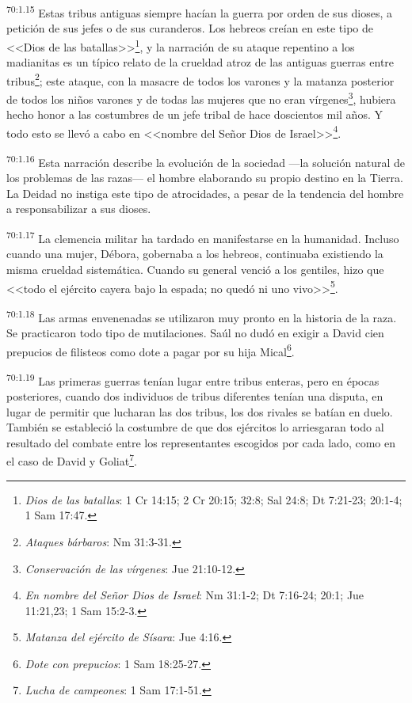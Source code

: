 \par
\textsuperscript{70:1.15} Estas tribus antiguas siempre hacían la guerra por orden de sus dioses, a petición de sus jefes o de sus curanderos. Los hebreos creían en este tipo de <<Dios de las batallas>>\footnote{\textit{Dios de las batallas}: 1 Cr 14:15; 2 Cr 20:15; 32:8; Sal 24:8; Dt 7:21-23; 20:1-4; 1 Sam 17:47.}, y la narración de su ataque repentino a los madianitas es un típico relato de la crueldad atroz de las antiguas guerras entre tribus\footnote{\textit{Ataques bárbaros}: Nm 31:3-31.}; este ataque, con la masacre de todos los varones y la matanza posterior de todos los niños varones y de todas las mujeres que no eran vírgenes\footnote{\textit{Conservación de las vírgenes}: Jue 21:10-12.}, hubiera hecho honor a las costumbres de un jefe tribal de hace doscientos mil años. Y todo esto se llevó a cabo en <<nombre del Señor Dios de Israel>>\footnote{\textit{En nombre del Señor Dios de Israel}: Nm 31:1-2; Dt 7:16-24; 20:1; Jue 11:21,23; 1 Sam 15:2-3.}.

\par
\textsuperscript{70:1.16} Esta narración describe la evolución de la sociedad ---la solución natural de los problemas de las razas--- el hombre elaborando su propio destino en la Tierra. La Deidad no instiga este tipo de atrocidades, a pesar de la tendencia del hombre a responsabilizar a sus dioses.

\par
\textsuperscript{70:1.17} La clemencia militar ha tardado en manifestarse en la humanidad. Incluso cuando una mujer, Débora, gobernaba a los hebreos, continuaba existiendo la misma crueldad sistemática. Cuando su general venció a los gentiles, hizo que <<todo el ejército cayera bajo la espada; no quedó ni uno vivo>>\footnote{\textit{Matanza del ejército de Sísara}: Jue 4:16.}.

\par
\textsuperscript{70:1.18} Las armas envenenadas se utilizaron muy pronto en la historia de la raza. Se practicaron todo tipo de mutilaciones. Saúl no dudó en exigir a David cien prepucios de filisteos como dote a pagar por su hija Mical\footnote{\textit{Dote con prepucios}: 1 Sam 18:25-27.}.

\par
\textsuperscript{70:1.19} Las primeras guerras tenían lugar entre tribus enteras, pero en épocas posteriores, cuando dos individuos de tribus diferentes tenían una disputa, en lugar de permitir que lucharan las dos tribus, los dos rivales se batían en duelo. También se estableció la costumbre de que dos ejércitos lo arriesgaran todo al resultado del combate entre los representantes escogidos por cada lado, como en el caso de David y Goliat\footnote{\textit{Lucha de campeones}: 1 Sam 17:1-51.}.

